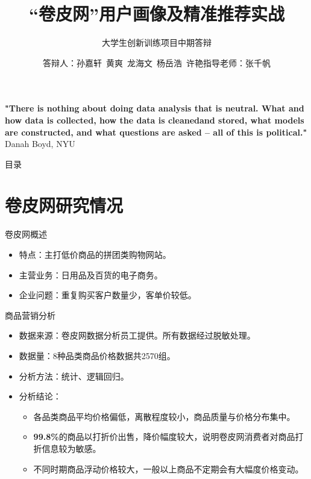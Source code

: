 \documentclass[10pt]{beamer}
\title[中期答辩]{“卷皮网”用户画像及精准推荐实战}
\subtitle{大学生创新训练项目中期答辩}
\author[用户画像与机器学习实战]{答辩人：孙嘉轩\ 黄爽\ 龙海文\ 杨岳浩\ 许艳\newline \newline 指导老师：张千帆}
\institute[]{华中科技大学管理学院}
\begin{document}

\frame{\titlepage}
\begin{frame}
\textbf{"There is nothing about doing data analysis that is neutral.\newline\newline
What and how data is collected, how the data is cleaned\newline\newline and
stored, what models are constructed, and what questions are\newline\newline
asked – all of this is political."}
\newline\newline Danah Boyd, NYU

\end{frame}

\begin{frame}{目录}
\tableofcontents
\end{frame}

\section{卷皮网研究情况}

\begin{frame}{卷皮网概述}
\begin{itemize}
\item 特点：主打低价商品的拼团类购物网站。\newline
\item 主营业务：日用品及百货的电子商务。\newline
\item 企业问题：重复购买客户数量少，客单价较低。
\end{itemize}
\end{frame}

\begin{frame}{商品营销分析}
\begin{itemize}
\item 数据来源：卷皮网数据分析员工提供。所有数据经过脱敏处理。\newline
\item 数据量：8种品类商品价格数据共2570组。\newline
\item 分析方法：统计、逻辑回归。\newline
\item 分析结论：\newline
  \begin{itemize}
    \item 各品类商品平均价格偏低，离散程度较小，商品质量与价格分布集中。\newline
    \item \textbf{99.8\%}的商品以打折价出售，降价幅度较大，说明卷皮网消费者对商品打折信息较为敏感。\newline
    \item 不同时期商品浮动价格较大，一般以上商品不定期会有大幅度价格变动。
  \end{itemize}
\end{itemize}
\end{frame}
\end{document}
